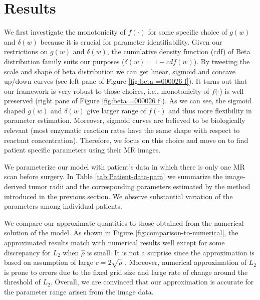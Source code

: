 \documentclass{aims}
\numberwithin{equation}{section}
\begin{document}
\section{Results}
We first investigate the monotonicity of $f(\cdot)$ for some specific
choice of $g(w)$ and $\delta(w)$ because it is crucial for parameter
identifiability. Given our restrictions on $g(w)$ and $\delta(w)$,
the cumulative density function (cdf) of Beta distribution family
suits our purposes ($\delta(w)=1-cdf(w)$). By tweeting the scale
and shape of beta distribution we can get linear, sigmoid and concave
up/down curves (see left pane of Figure \ref{fig:beta =000026 f}).
It turns out that our framework is very robust to those choices, i.e.,
monotonicity of $f(\cdot$) is well preserved (right pane of Figure
\ref{fig:beta =000026 f}). As we can see, the sigmoid shaped $g(w)$
and $\delta(w)$ give larger range of $f(\cdot)$ and thus more flexibility
in parameter estimation. Moreover, sigmoid curves are believed to
be biologically relevant (most enzymatic reaction rates have the same
shape with respect to reactant concentration). Therefore, we focus
on this choice and move on to find patient specific parameters using
their MR images. 

We parameterize our model with patient's data in which there is only
one MR scan before surgery. In Table \ref{tab:Patient-data-para}
we summarize the image-derived tumor radii and the corresponding parameters
estimated by the method introduced in the previous section. We observe
substantial variation of the parameters among individual patients. 

We compare our approximate quantities to those obtained from the numerical
solution of the model. As shown in Figure \ref{fig:comparison-to-numerical},
the approximated results match with numerical results well except
for some discrepancy for $L_{2}$ when $\hat{\rho}$ is small. It
is not a surprise since the approximation is based on assumption of
large $c=2\sqrt{\hat{\rho}}$ . Moreover, numerical approximation
of $L_{2}$ is prone to errors due to the fixed grid size and large
rate of change around the threshold of $L_{2}$. Overall, we are convinced
that our approximation is accurate for the parameter range arisen
from the image data. 
\end{document}
